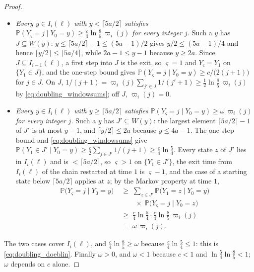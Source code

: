 \begin{proof}
\begin{itemize}
{    $c/\bigl(2(j+1)\bigr)$.} By Lemma~\ref{lem:doubling_descent} that mass is $w_z(j)/R_0(z)$,
    where $w_z(j)=q_z(j)(z/j)^{p}$ with $(z/j)^{p}\geq1$ because $j\leq z-1$,
    $q_z(j)=c/\bigl((j+1)(1-\varepsilon(z))\bigr)\geq c/(j+1)$ because $0<\varepsilon(z)<1$,
    and $R_0(z)\leq2$ by \eqref{eq:doubling_R0}, $z$ being $\geq2\ell\geq\ell_2\geq\ell_1$,
    with $\ell_1$ of Lemma~\ref{lem:doubling_descent} and $\ell_2$ of
    Lemma~\ref{lem:doubling_escape}.
    \item \emph{Every $y\in I_i(\ell)$ with $y<\lceil5a/2\rceil$ satisfies
    $\mathbb P(Y_\varsigma=j\mid Y_0=y)\geq\tfrac c4\ln\tfrac85\,\varpi_i(j)$ for every integer
    $j$.} Such a $y$ has $J\subseteq W(y)$: $y\leq\lceil5a/2\rceil-1\leq(5a-1)/2$ gives
    $y/2\leq(5a-1)/4$ and hence $\lceil y/2\rceil\leq\lceil5a/4\rceil$, while $2a-1\leq y-1$
    because $y\geq2a$. Since $J\subseteq I_{i-1}(\ell)$, a first step into $J$ is the exit, so
    $\varsigma=1$ and $Y_\varsigma=Y_1$ on $\{Y_1\in J\}$, and the one-step bound gives
    $\mathbb P(Y_\varsigma=j\mid Y_0=y)\geq c/\bigl(2(j+1)\bigr)$ for $j\in J$. On $J$,
    $1/(j+1)=\varpi_i(j)\sum_{j'\in J}1/(j'+1)\geq\tfrac12\ln\tfrac85\,\varpi_i(j)$ by
    \eqref{eq:doubling_windowsums}; off $J$, $\varpi_i(j)=0$.
    \item \emph{Every $y\in I_i(\ell)$ with $y\geq\lceil5a/2\rceil$ satisfies
    $\mathbb P(Y_\varsigma=j\mid Y_0=y)\geq\omega\,\varpi_i(j)$ for every integer $j$.} Such a
    $y$ has $J'\subseteq W(y)$: the largest element $\lceil5a/2\rceil-1$ of $J'$ is at most
    $y-1$, and $\lceil y/2\rceil\leq2a$ because $y\leq4a-1$. The one-step bound and
    \eqref{eq:doubling_windowsums} give
    $\mathbb P(Y_1\in J'\mid Y_0=y)\geq\tfrac c2\sum_{j\in J'}1/(j+1)\geq\tfrac c4\ln\tfrac54$.
    Every state $z$ of $J'$ lies in $I_i(\ell)$ and is $<\lceil5a/2\rceil$, so $\varsigma>1$ on
    $\{Y_1\in J'\}$, the exit time from $I_i(\ell)$ of the chain restarted at time $1$ is
    $\varsigma-1$, and the case of a starting state below $\lceil5a/2\rceil$ applies at $z$; by
    the Markov property at time $1$,
    \begin{equation}
    \begin{aligned}
        \mathbb P\bigl(Y_\varsigma=j\mid Y_0=y\bigr)
        \;&\geq\;\sum_{z\in J'}\mathbb P\bigl(Y_1=z\mid Y_0=y\bigr)\\
        &\qquad\times\;\mathbb P\bigl(Y_\varsigma=j\mid Y_0=z\bigr)\\
        \;&\geq\;\tfrac c4\ln\tfrac54\cdot\tfrac c4\ln\tfrac85\,\varpi_i(j)\\
        \;&=\;\omega\,\varpi_i(j).
    \end{aligned}
    \end{equation}
\end{itemize}
The two cases cover $I_i(\ell)$, and $\tfrac c4\ln\tfrac85\geq\omega$ because
$\tfrac c4\ln\tfrac54\leq1$: this is \eqref{eq:doubling_doeblin}. Finally $\omega>0$, and
$\omega<1$ because $c<1$ and $\ln\tfrac54\ln\tfrac85<1$; $\omega$ depends on $c$ alone.
\end{proof}

